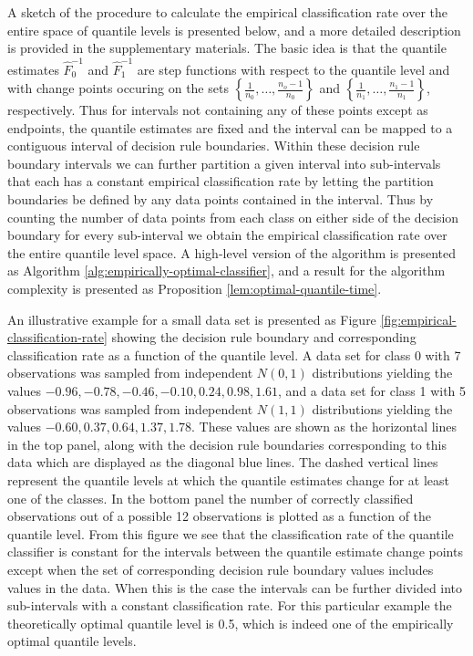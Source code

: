 A sketch of the procedure to calculate the empirical classification rate over
the entire space of quantile levels is presented below, and a more detailed
description is provided in the supplementary materials.  The basic idea is that
the quantile estimates $\hat{F}_0^{-1}$ and $\hat{F}_1^{-1}$ are step functions
with respect to the quantile level and with change points occuring on the sets
$\left\{\frac{1}{n_0}, \dots, \frac{n_o - 1}{n_0}\right\}$ and
$\left\{\frac{1}{n_1}, \dots, \frac{n_1 - 1}{n_1}\right\}$, respectively.  Thus
for intervals not containing any of these points except as endpoints, the
quantile estimates are fixed and the interval can be mapped to a contiguous
interval of decision rule boundaries.  Within these decision rule boundary
intervals we can further partition a given interval into sub-intervals that each
has a constant empirical classification rate by letting the partition boundaries
be defined by any data points contained in the interval.  Thus by counting the
number of data points from each class on either side of the decision boundary
for every sub-interval we obtain the empirical classification rate over the
entire quantile level space.  A high-level version of the algorithm is presented
as Algorithm \ref{alg:empirically-optimal-classifier}, and a result for the
algorithm complexity is presented as Proposition
\ref{lem:optimal-quantile-time}.

An illustrative example for a small data set is presented as Figure
\ref{fig:empirical-classification-rate} showing the decision rule boundary and
corresponding classification rate as a function of the quantile level.  A data
set for class 0 with 7 observations was sampled from independent $N(0, 1)$
distributions yielding the values
$-0.96,\allowbreak -0.78,\allowbreak -0.46,\allowbreak -0.10,\allowbreak
0.24,\allowbreak 0.98,\allowbreak 1.61$, and a data set for class 1 with 5
observations was sampled from independent $N(1, 1)$ distributions yielding the
values
$-0.60,\allowbreak 0.37,\allowbreak 0.64,\allowbreak 1.37,\allowbreak 1.78$.
These values are shown as the horizontal lines in the top panel, along with the
decision rule boundaries corresponding to this data which are displayed as the
diagonal blue lines.  The dashed vertical lines represent the quantile levels at
which the quantile estimates change for at least one of the classes.  In the
bottom panel the number of correctly classified observations out of a possible
12 observations is plotted as a function of the quantile level.  From this
figure we see that the classification rate of the quantile classifier is
constant for the intervals between the quantile estimate change points except
when the set of corresponding decision rule boundary values includes values in
the data.  When this is the case the intervals can be further divided into
sub-intervals with a constant classification rate.  For this particular example
the theoretically optimal quantile level is 0.5, which is indeed one of the
empirically optimal quantile levels.

